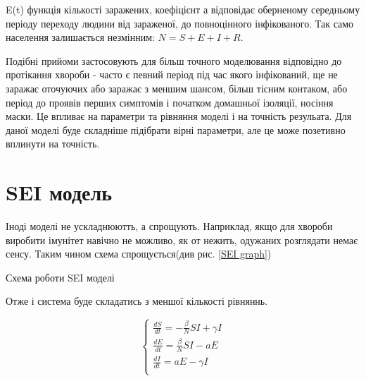 E(t) функція кількості заражених, коефіцієнт а відповідає оберненому середньому періоду переходу людини від зараженої, до повноцінного інфікованого.
Так само населення залишається незмінним: $ N = S + E + I + R $.

Подібні прийоми застосовують для більш точного моделювання відповідно до
протікання хвороби - часто є певний період під час якого інфікований, 
ще не заражає оточуючих або заражає з меншим шансом, більш тісним контаком, 
або період до проявів перших симптомів і початком домашньої ізоляції,
носіння маски. 
Це впливає на параметри та рівняння моделі і на точність резульата. 
Для даної моделі буде складніше підібрати вірні параметри, 
але це може позетивно вплинути на точність. \cite{rahimi_review_2021}

\section{SEI модель}

Іноді моделі не ускладнюютть, а спрощують. 
Наприклад, якщо для хвороби виробити імунітет навічно не можливо, 
як от нежить, одужаних розглядати немає сенсу.\cite{kim_asymptotic_2008} 
Таким чином схема спрощується(див рис. \ref{SEI graph})

\begin{risunok}[ht]
    \centering
    \vspace{0.5cm}
    \caption{Схема роботи SEI моделі}
    \label{SEI graph}
\end{risunok}

Отже і система буде складатись з меншої кількості рівняннь.

\begin{equation*}
    \begin{cases}
        \frac{dS}{dt} = - \frac{\beta}{N}SI + \gamma I \\
        \frac{dE}{dt} = \frac{\beta}{N}SI - aE         \\
        \frac{dI}{dt} = aE - \gamma I                  \\
    \end{cases}
\end{equation*}


